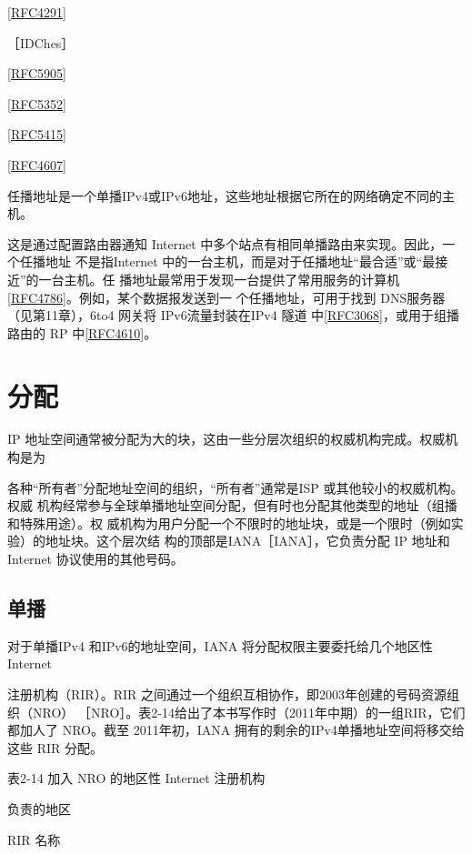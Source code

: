 \href{https://www.rfc-editor.org/rfc/rfc4291}{[RFC4291]}

［IDChes］

\href{https://www.rfc-editor.org/rfc/rfc5905}{[RFC5905]}

\href{https://www.rfc-editor.org/rfc/rfc5352}{[RFC5352]}

\href{https://www.rfc-editor.org/rfc/rfc5415}{[RFC5415]}

\href{https://www.rfc-editor.org/rfc/rfc4607}{[RFC4607]}

任播地址是一个单播IPv4或IPv6地址，这些地址根据它所在的网络确定不同的主机。

这是通过配置路由器通知 Internet 中多个站点有相同单播路由来实现。因此，一个任播地址
不是指Internet 中的一台主机，而是对于任播地址“最合适”或“最接近”的一台主机。任
播地址最常用于发现一台提供了常用服务的计算机\href{https://www.rfc-editor.org/rfc/rfc4786}{[RFC4786]}。例如，某个数据报发送到一
个任播地址，可用于找到 DNS服务器（见第11章），6to4 网关将 IPv6流量封装在IPv4 隧道
中\href{https://www.rfc-editor.org/rfc/rfc3068}{[RFC3068]}，或用于组播路由的 RP 中\href{https://www.rfc-editor.org/rfc/rfc4610}{[RFC4610]}。

\section{分配}
IP 地址空间通常被分配为大的块，这由一些分层次组织的权威机构完成。权威机构是为

各种“所有者”分配地址空间的组织，“所有者”通常是ISP 或其他较小的权威机构。权威
机构经常参与全球单播地址空间分配，但有时也分配其他类型的地址（组播和特殊用途）。权
威机构为用户分配一个不限时的地址块，或是一个限时（例如实验）的地址块。这个层次结
构的顶部是IANA［IANA］，它负责分配 IP 地址和 Internet 协议使用的其他号码。

\subsection{单播}
对于单播IPv4 和IPv6的地址空间，IANA 将分配权限主要委托给几个地区性 Internet

注册机构（RIR）。RIR 之间通过一个组织互相协作，即2003年创建的号码资源组织（NRO）
［NRO］。表2-14给出了本书写作时（2011年中期）的一组RIR，它们都加人了 NRO。截至
2011年初，IANA 拥有的剩余的IPv4单播地址空间将移交给这些 RIR 分配。

表2-14 加入 NRO 的地区性 Internet 注册机构

负责的地区

RIR 名称


